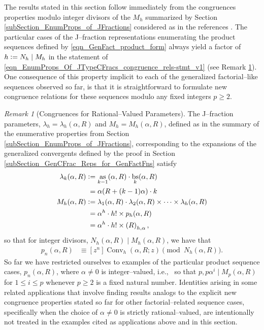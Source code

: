 \documentclass[12pt,reqno]{article}
\numberwithin{sfootnote}{section}
\numberwithin{equation}{section}
\theoremstyle{plain}
\theoremstyle{definition}
\theoremstyle{remark}
\newtheorem{remark}[theorem]{Remark}
\newcommand{\cf}[0]{cf.\ }
\newcommand{\ie}[0]{i.e.,\ }
\newcommand{\defequals}{\ensuremath{\vcentcolon=}}
\newcommand{\Pochhammer}[2]{\ensuremath{\left(#1\right)_{#2}}}
\newcommand{\ConvGF}[4]{\ensuremath{\Conv_{#1}\left(#2, #3; #4\right)}}
\DeclareMathOperator{\Conv}{Conv}
\DeclareMathOperator{\as}{as}
\DeclareMathOperator{\bs}{bs}
\begin{document}
The results stated in this section follow immediately 
from the congruences properties modulo integer divisors of the $M_h$ 
summarized by Section \ref{subSection_EnumProps_of_JFractions} 
considered as in the references \citep{FLAJOLET80B,FLAJOLET82} 
\citep[\cf \S 5.7]{GFLECT}. 
The particular cases of the J--fraction representations enumerating the 
product sequences defined by \eqref{eqn_GenFact_product_form} 
always yield a factor of $h \defequals N_h \mid M_h$ in the statement of 
\eqref{eqn_EnumProps_Of_JTypeCFracs_congruence_rels-stmt_v1} 
(see Remark \ref{remark_Congruences_for_Rational-Valued_Params}). 
One consequence of this property implicit to each of the generalized 
factorial--like sequences observed so far, is that it is straightforward to 
formulate new congruence relations for these sequences modulo any 
fixed integers $p \geq 2$. 

\begin{remark}[Congruences for Rational--Valued Parameters] 
\label{remark_Congruences_for_Rational-Valued_Params} 
The J--fraction parameters, 
$\lambda_h = \lambda_h(\alpha, R)$ and $M_h = M_h(\alpha, R)$, 
defined as in the summary of the enumerative properties from 
Section \ref{subSection_EnumProps_of_JFractions}, 
corresponding to the 
expansions of the generalized convergents defined by the proof in 
Section \ref{subSection_GenCFrac_Reps_for_GenFactFns} 
satisfy 
\begin{align*} 
\lambda_k(\alpha, R) & \defequals 
     \as_{k-1}(\alpha, R) \cdot \bs_{k}(\alpha, R) \\ 
   & \phantom{:} = 
     \alpha (R + (k-1) \alpha) \cdot k \\ 
M_h(\alpha, R) & \defequals 
     \lambda_1(\alpha, R) \cdot \lambda_2(\alpha, R) 
     \times \cdots \times 
     \lambda_h(\alpha, R) \\ 
   & \phantom{:} = 
     \alpha^{h} \cdot h! \times p_h(\alpha, R) \\ 
   & \phantom{:} = 
   \alpha^{h} \cdot h! \times \Pochhammer{R}{h,\alpha}, 
\end{align*} 
so that for integer divisors, $N_h(\alpha, R) \mid M_h(\alpha, R)$, 
we have that 
\begin{align*} 
p_n(\alpha, R) & \equiv 
     [z^n] \ConvGF{h}{\alpha}{R}{z} \pmod{N_h(\alpha, R)}. 
\end{align*} 
So far we have restricted ourselves to examples of the 
particular product sequence cases, $p_n(\alpha, R)$, 
where $\alpha \neq 0$ is integer--valued, \ie 
so that $p, p\alpha^{i} \mid M_p(\alpha, R)$ for $1 \leq i \leq p$ 
whenever $p \geq 2$ is a fixed natural number. 
Identities arising in some 
related applications that involve finding results analogs to the 
explicit new congruence properties stated so far for other 
factorial--related sequence cases, specifically when the choice of 
$\alpha \neq 0$ is strictly rational--valued, 
are intentionally not treated in the examples cited as applications 
above and in this section. 
\end{remark} 
\end{document}
